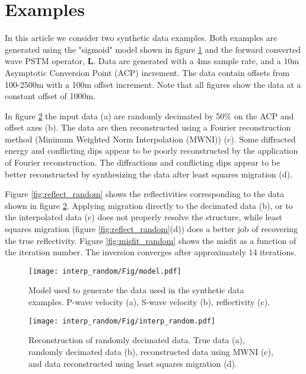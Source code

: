 \section{Examples}

In this article we consider two synthetic data examples. Both examples are generated using the "sigmoid" model \citep{claerbout1992earth} shown in figure \ref{fig:model} and the forward converted wave PSTM operator, $\mathbf{L}$. Data are generated with a 4ms sample rate, and a 10m Asymptotic Conversion Point (ACP) increment. The data contain offsets from 100-2500m with a 100m offset increment. Note that all figures show the data at a constant offset of 1000m. 

In figure \ref{fig:interp_random} the input data (a) are randomly decimated by 50\% on the ACP and offset axes (b). The data are then reconstructed using a Fourier reconstruction method (Minimum Weighted Norm Interpolation (MWNI)) (c). Some diffracted energy and conflicting dips appear to be poorly reconstructed by the application of Fourier reconstruction. The diffractions and conflicting dips appear to be better reconstructed by synthesizing the data after least squares migration (d). 

Figure \ref{fig:reflect_random} shows the reflectivities corresponding to the data shown in figure \ref{fig:interp_random}. Applying migration directly to the decimated data (b), or to the interpolated data (c) does not properly resolve the structure, while least squares migration (figure \ref{fig:reflect_random}(d)) does a better job of recovering the true reflectivity. Figure \ref{fig:misfit_random} shows the misfit as a function of the iteration number. The inversion converges after approximately 14 iterations.

\begin{figure}[h] %
	\centering
	\texttt{[image: interp\_random/Fig/model.pdf]}
	\caption{Model used to generate the data used in the synthetic data examples. P-wave velocity (a), S-wave velocity (b), reflectivity (c).}
	\label{fig:model}
\end{figure}

\begin{figure}[h] %
	\centering
	\texttt{[image: interp\_random/Fig/interp\_random.pdf]}
	\caption{Reconstruction of randomly decimated data. True data (a), randomly decimated data (b), reconstructed data using MWNI (c), and data reconstructed using least squares migration (d).}
	\label{fig:interp_random}
\end{figure}

